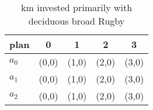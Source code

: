 \documentclass[a4paper]{article}
\begin{document}
\begin{table}
\begin{adjustbox}{width=0.6\columnwidth}
\begin{tabular}{|l|l|l|l|l|}
\hline
\textbf{plan} & \multicolumn{1}{c|}{\textbf{0}} & \multicolumn{1}{c|}{\textbf{1}} & \multicolumn{1}{c|}{\textbf{2}} & \multicolumn{1}{c|}{\textbf{3}} \\ \hline
\textbf{$a_0$}  & (0,0) & (1,0) & (2,0) & (3,0) \\ \hline
\textbf{$a_1$}  & (0,0) & (1,0) & (2,0) & (3,0) \\ \hline
\textbf{$a_2$}  & (0,0) & (1,0) & (2,0) & (3,0) \\ \hline
\end{tabular}
\end{adjustbox}
\caption{ km invested primarily with deciduous broad Rugby
}
\end{table}
\end{document}
